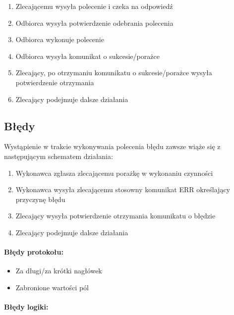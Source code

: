 \documentclass[10pt,a4paper]{article}
\begin{document}
			\begin{enumerate}
	            \item Zlecającemu wysyła polecenie i czeka na odpowiedź
	            \item Odbiorca wysyła potwierdzenie odebrania polecenia
	            \item Odbiorca wykonuje polecenie
	            \item Odbiorca wysyła komunikat o sukcesie/porażce
	            \item Zlecający, po otrzymaniu komunikatu o sukcesie/porażce wysyła potwierdzenie otrzymania
	            \item Zlecający podejmuje dalsze działania 
			\end{enumerate} 
		 
        \subsection{Błędy}
            Wystąpienie w trakcie wykonywania polecenia błędu zawsze wiąże się z następującym schematem działania:
            
            \begin{enumerate}
	            \item Wykonawca zgłasza zlecającemu porażkę w wykonaniu czynności
	            \item Wykonawca wysyła zlecającemu stosowny komunikat ERR określający przyczynę błędu
	            \item Zlecający wysyła potwierdzenie otrzymania komunikatu o błędzie
	            \item Zlecający podejmuje dalsze działania  
            \end{enumerate}
            
            \paragraph{Błędy protokołu:}
            
            \begin{itemize}
	            \item Za długi/za krótki nagłówek
	            \item Zabronione wartości pól 
            \end{itemize}
            
            \paragraph{Błędy logiki:}
            
\end{document}
